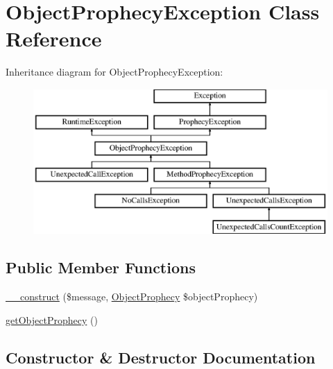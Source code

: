 \hypertarget{class_prophecy_1_1_exception_1_1_prophecy_1_1_object_prophecy_exception}{}\section{Object\+Prophecy\+Exception Class Reference}
\label{class_prophecy_1_1_exception_1_1_prophecy_1_1_object_prophecy_exception}
Inheritance diagram for Object\+Prophecy\+Exception\+:\begin{figure}[H]
\begin{center}
\leavevmode
\includegraphics[height=5.544555cm]{class_prophecy_1_1_exception_1_1_prophecy_1_1_object_prophecy_exception}
\end{center}
\end{figure}
\subsection*{Public Member Functions}
\begin{DoxyCompactItemize}
\item 
\mbox{\hyperlink{class_prophecy_1_1_exception_1_1_prophecy_1_1_object_prophecy_exception_aa9029959ba9fd11ba9ec47ab73c0bf8a}{\+\_\+\+\_\+construct}} (\$message, \mbox{\hyperlink{class_prophecy_1_1_prophecy_1_1_object_prophecy}{Object\+Prophecy}} \$object\+Prophecy)
\item 
\mbox{\hyperlink{class_prophecy_1_1_exception_1_1_prophecy_1_1_object_prophecy_exception_a1cff2ecad65e616019de966935f0fe94}{get\+Object\+Prophecy}} ()
\end{DoxyCompactItemize}


\subsection{Constructor \& Destructor Documentation}
\mbox{\label{class_prophecy_1_1_exception_1_1_prophecy_1_1_object_prophecy_exception_aa9029959ba9fd11ba9ec47ab73c0bf8a}} 
